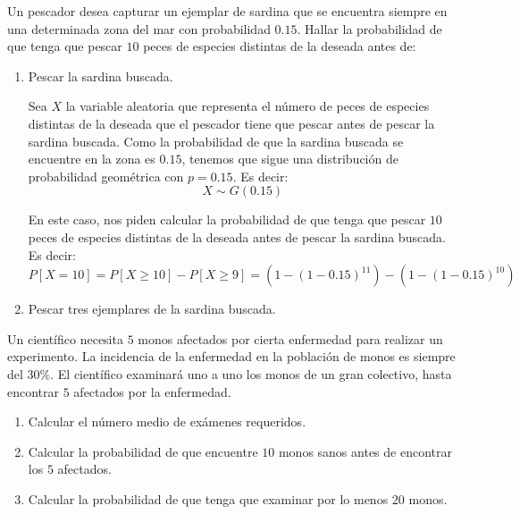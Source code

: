 \begin{ejercicio}
    Un pescador desea capturar un ejemplar de sardina que se encuentra siempre en una determinada
    zona del mar con probabilidad $0.15$. Hallar la probabilidad de que tenga que pescar $10$ peces de
    especies distintas de la deseada antes de:
    \begin{enumerate}
        \item Pescar la sardina buscada.
        
        Sea $X$ la variable aleatoria que representa el número de peces de especies distintas de la deseada que el pescador tiene que pescar antes de pescar la sardina buscada. Como la probabilidad de que la sardina buscada se encuentre en la zona es $0.15$, tenemos que sigue una distribución de probabilidad geométrica con $p=0.15$. Es decir:
        \begin{equation*}
            X \sim G(0.15)
        \end{equation*}

        En este caso, nos piden calcular la probabilidad de que tenga que pescar $10$ peces de especies distintas de la deseada antes de pescar la sardina buscada. Es decir:
        \begin{equation*}
            P[X=10] = P[X\geq 10] - P[X\geq 9] = (1-(1-0.15)^11) - (1-(1-0.15)^10)
        \end{equation*}
        
        \item Pescar tres ejemplares de la sardina buscada.
    \end{enumerate}

\end{ejercicio}

\begin{ejercicio}
    Un científico necesita $5$ monos afectados por cierta enfermedad para realizar un experimento. La
    incidencia de la enfermedad en la población de monos es siempre del $30\%$. El científico examinará
    uno a uno los monos de un gran colectivo, hasta encontrar $5$ afectados por la enfermedad.
    \begin{enumerate}
        \item Calcular el número medio de exámenes requeridos.
        \item Calcular la probabilidad de que encuentre $10$ monos sanos antes de encontrar los $5$ afectados.
        \item Calcular la probabilidad de que tenga que examinar por lo menos $20$ monos.
    \end{enumerate}
\end{ejercicio}

